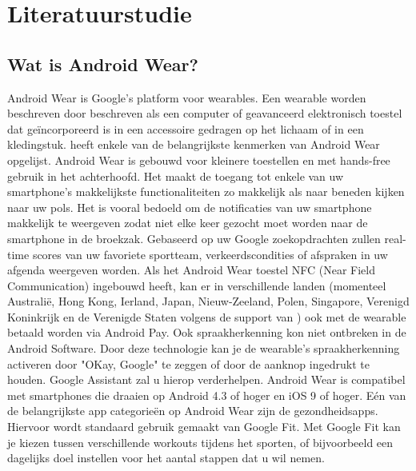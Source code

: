
\chapter{Literatuurstudie}
\label{ch:literatuurstudie}

\section{Wat is Android Wear?}
\label{sec:androidwear}
Android Wear is Google's platform voor wearables. Een wearable worden beschreven door \textcite{Dictionary} beschreven als een computer of geavanceerd elektronisch toestel dat geïncorporeerd is in een accessoire gedragen op het lichaam of in een kledingstuk. 
\textcite{Techradar} heeft enkele van de belangrijkste kenmerken van Android Wear opgelijst.
Android Wear is gebouwd voor kleinere toestellen en met hands-free gebruik in het achterhoofd. Het maakt de toegang tot enkele van uw smartphone's makkelijkste functionaliteiten zo makkelijk als naar beneden kijken naar uw pols. Het is vooral bedoeld om de notificaties van uw smartphone makkelijk te weergeven zodat niet elke keer gezocht moet worden naar de smartphone in de broekzak. Gebaseerd op uw Google zoekopdrachten zullen real-time scores van uw favoriete sportteam, verkeerdscondities of afspraken in uw afgenda weergeven worden. Als het Android Wear toestel NFC (Near Field Communication) ingebouwd heeft, kan er in verschillende landen (momenteel Australië, Hong Kong, Ierland, Japan, Nieuw-Zeeland, Polen, Singapore, Verenigd Koninkrijk en de Verenigde Staten volgens de support van \cite{Androidpay}) ook met de wearable betaald worden via Android Pay. Ook spraakherkenning kon niet ontbreken in de Android Software. Door deze technologie kan je de wearable's spraakherkenning activeren door "OKay, Google" te zeggen of door de aanknop ingedrukt te houden. Google Assistant zal u hierop verderhelpen. Android Wear is compatibel met smartphones die draaien op Android 4.3 of hoger en iOS 9 of hoger. Eén van de belangrijkste app categorieën op Android Wear zijn de gezondheidsapps. Hiervoor wordt standaard gebruik gemaakt van Google Fit. Met Google Fit kan je kiezen tussen verschillende workouts tijdens het sporten, of bijvoorbeeld een dagelijks doel instellen voor het aantal stappen dat u wil nemen.  
